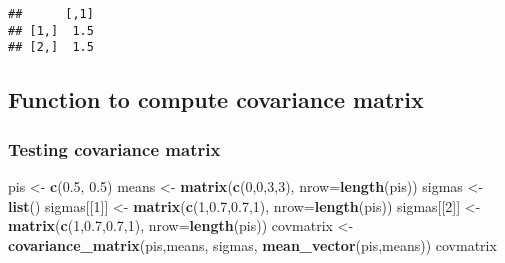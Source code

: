 \documentclass[]{article}
\newenvironment{Shaded}{\begin{snugshade}}{\end{snugshade}}
\newcommand{\ControlFlowTok}[1]{\textcolor[rgb]{0.13,0.29,0.53}{\textbf{#1}}}
\newcommand{\DataTypeTok}[1]{\textcolor[rgb]{0.13,0.29,0.53}{#1}}
\newcommand{\DecValTok}[1]{\textcolor[rgb]{0.00,0.00,0.81}{#1}}
\newcommand{\FloatTok}[1]{\textcolor[rgb]{0.00,0.00,0.81}{#1}}
\newcommand{\KeywordTok}[1]{\textcolor[rgb]{0.13,0.29,0.53}{\textbf{#1}}}
\newcommand{\NormalTok}[1]{#1}
\newcommand{\OperatorTok}[1]{\textcolor[rgb]{0.81,0.36,0.00}{\textbf{#1}}}
\newcommand{\StringTok}[1]{\textcolor[rgb]{0.31,0.60,0.02}{#1}}
\begin{document}
\begin{verbatim}
##      [,1]
## [1,]  1.5
## [2,]  1.5
\end{verbatim}

\hypertarget{function-to-compute-covariance-matrix}{%
\subsection{Function to compute covariance
matrix}\label{function-to-compute-covariance-matrix}}

\begin{Shaded}
\end{Shaded}

\hypertarget{testing-covariance-matrix}{%
\subsubsection{Testing covariance
matrix}\label{testing-covariance-matrix}}

\begin{Shaded}
\begin{Highlighting}[]
\NormalTok{pis <-}\StringTok{ }\KeywordTok{c}\NormalTok{(}\FloatTok{0.5}\NormalTok{, }\FloatTok{0.5}\NormalTok{)}
\NormalTok{means <-}\StringTok{ }\KeywordTok{matrix}\NormalTok{(}\KeywordTok{c}\NormalTok{(}\DecValTok{0}\NormalTok{,}\DecValTok{0}\NormalTok{,}\DecValTok{3}\NormalTok{,}\DecValTok{3}\NormalTok{), }\DataTypeTok{nrow=}\KeywordTok{length}\NormalTok{(pis))}
\NormalTok{sigmas <-}\StringTok{ }\KeywordTok{list}\NormalTok{()}
\NormalTok{sigmas[[}\DecValTok{1}\NormalTok{]] <-}\StringTok{ }\KeywordTok{matrix}\NormalTok{(}\KeywordTok{c}\NormalTok{(}\DecValTok{1}\NormalTok{,}\FloatTok{0.7}\NormalTok{,}\FloatTok{0.7}\NormalTok{,}\DecValTok{1}\NormalTok{), }\DataTypeTok{nrow=}\KeywordTok{length}\NormalTok{(pis))}
\NormalTok{sigmas[[}\DecValTok{2}\NormalTok{]] <-}\StringTok{ }\KeywordTok{matrix}\NormalTok{(}\KeywordTok{c}\NormalTok{(}\DecValTok{1}\NormalTok{,}\FloatTok{0.7}\NormalTok{,}\FloatTok{0.7}\NormalTok{,}\DecValTok{1}\NormalTok{), }\DataTypeTok{nrow=}\KeywordTok{length}\NormalTok{(pis))}
\NormalTok{covmatrix <-}\StringTok{ }\KeywordTok{covariance_matrix}\NormalTok{(pis,means, sigmas, }\KeywordTok{mean_vector}\NormalTok{(pis,means))}
\NormalTok{covmatrix}
\end{Highlighting}
\end{Shaded}
\end{document}
